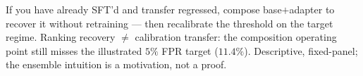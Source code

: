 {If you have already SFT'd and transfer regressed, compose base$+$adapter to recover it without
retraining --- then recalibrate the threshold on the target regime.}
{Ranking recovery $\neq$ calibration transfer: the composition operating point still misses the
illustrated $5\%$ FPR target ($11.4\%$). Descriptive, fixed-panel; the ensemble intuition is a
motivation, not a proof.}
